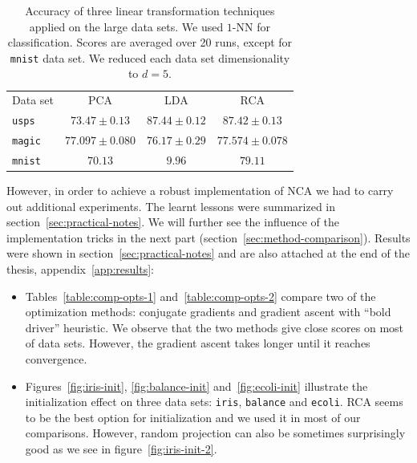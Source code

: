 \begin{table}
  \centering\begin{tabular}{lccc}
  \toprule
  Data set & PCA & LDA & RCA \\
  \cmidrule(r){2-4}
\texttt{usps}&$73.47 \pm 0.13$&$87.44 \pm 0.12$&$87.42 \pm 0.13$\\ 
\texttt{magic}&$77.097 \pm 0.080$&$76.17 \pm 0.29$&$77.574 \pm 0.078$\\ 
\texttt{mnist}&$70.13$&$9.96$&$79.11$\\
\bottomrule
  \end{tabular}
  \caption{\small Accuracy of three linear transformation techniques applied on the large data sets. We used $1$-NN for classification. Scores are averaged over 20 runs, except for \texttt{mnist} data set. We reduced each data set dimensionality to $d=5$.}
  \label{table:eval-baseline-large-data-sets}
\end{table}
% 

However, in order to achieve a robust implementation of NCA we had to carry out additional experiments. The learnt lessons were summarized in section~\ref{sec:practical-notes}. We will further see the influence of the implementation tricks in the next part (section~\ref{sec:method-comparison}). Results were shown in section~\ref{sec:practical-notes} and are also attached at the end of the thesis, appendix~\ref{app:results}:
\begin{itemize}
 \item Tables~\ref{table:comp-opts-1} and~\ref{table:comp-opts-2} compare two of the optimization methods: conjugate gradients and gradient ascent with ``bold driver'' heuristic. We observe that the two methods give close scores on most of data sets. However, the gradient ascent takes longer until it reaches convergence.
 \item Figures~\ref{fig:iris-init}, \ref{fig:balance-init} and~\ref{fig:ecoli-init} illustrate the initialization effect on three data sets: \texttt{iris}, \texttt{balance} and \texttt{ecoli}. RCA seems to be the best option for initialization and we used it in most of our comparisons. However, random projection can also be sometimes surprisingly good as we see in figure~\ref{fig:iris-init-2}. 
\end{itemize}


